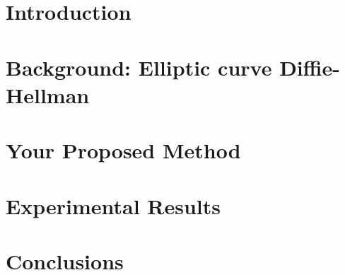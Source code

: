 


%
\maketitle
%

\begin{abstract}

\end{abstract}

\section{Introduction}\label{sec:intro}


\section{Background: Elliptic curve Diffie-Hellman}\label{sec:background}


\section{Your Proposed Method}\label{sec:yourmethod}


\section{Experimental Results}\label{sec:exp}


\section{Conclusions}







